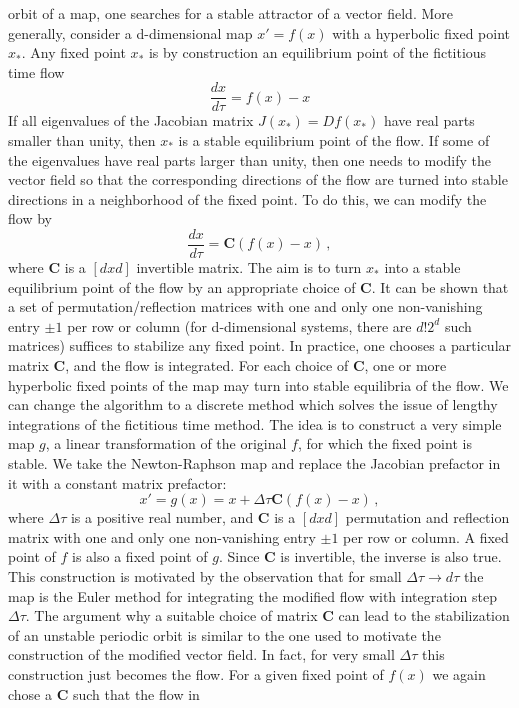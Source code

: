 \begin{description}
orbit of a map, one searches for a stable attractor of a vector field.
More generally, consider a d-dimensional map $x'=f(x)$ with a hyperbolic
fixed point $x_*$. Any fixed point $x_*$ is by construction an
equilibrium point of the fictitious time flow
$$\frac{dx}{d\tau}=f(x)-x$$
If all eigenvalues of the Jacobian matrix $J(x_*)=Df(x_*)$ have real
parts smaller than unity, then $x_*$ is a stable equilibrium point of the
flow. If some of the eigenvalues have real parts larger than unity, then
one needs to modify the vector field so that the corresponding directions
of the flow are turned into stable directions in a neighborhood of the
fixed point. To do this, we can modify the flow by
$$
\frac{dx}{d\tau}=\textbf{C}(f(x)-x)
\,,
$$
where $\textbf{C}$ is a $[dxd]$ invertible matrix. The aim is to turn
$x_*$ into a stable equilibrium point of the flow by an appropriate
choice of $\textbf{C}$. It can be shown that a set of
permutation/reflection matrices with one and only one non-vanishing entry
$\pm 1$ per row or column (for d-dimensional systems, there are $d!2^d$
such matrices) suffices to stabilize any fixed point. In practice, one
chooses a particular matrix $\textbf{C}$, and the flow is integrated. For
each choice of $\textbf{C}$, one or more hyperbolic fixed points of the
map may turn into stable equilibria of the flow. We can change the
algorithm to a discrete method which solves the issue of lengthy
integrations of the fictitious time method. The idea is to construct a
very simple map $g$, a linear transformation of the original $f$, for
which the fixed point is stable. We take the Newton-Raphson map and
replace the Jacobian prefactor in it with a constant matrix prefactor:
$$
x'=g(x)=x+\Delta\tau\textbf{C}(f(x)-x)
\,,
$$
where $\Delta\tau$ is a positive real number, and $\textbf{C}$ is a
$[dxd]$ permutation and reflection matrix with one and only one
non-vanishing entry $\pm 1$ per row or column. A fixed point of $f$ is
also a fixed point of $g$. Since $\textbf{C}$ is invertible, the inverse
is also true. This construction is motivated by the observation that for
small $\Delta\tau\rightarrow d\tau$ the map is the Euler method for
integrating the modified flow with integration step $\Delta\tau$. The
argument why a suitable choice of matrix $\textbf{C}$ can lead to the
stabilization of an unstable periodic orbit is similar to the one used to
motivate the construction of the modified vector field. In fact, for very
small $\Delta\tau$ this construction just becomes the flow. For a given
fixed point of $f(x)$ we again chose a $\textbf{C}$ such that the flow in

\end{description}

